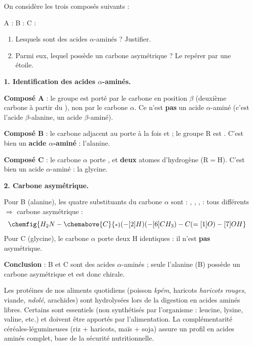 \documentclass[11pt]{article}
\newcommand{\cle}[1]{{\popxbold\color{popdark}#1}}
\begin{document}
\begin{exoresolu}
On considère les trois composés suivants :
\begin{center}
A :  \qquad
B :  \qquad
C : 
\end{center}
\begin{enumerate}
\item Lesquels sont des acides $\alpha$-aminés ? Justifier.
\item Parmi eux, lequel possède un carbone asymétrique ? Le repérer par une étoile.
\end{enumerate}
\tcblower
\textbf{1. Identification des acides $\alpha$-aminés.}

\textbf{Composé A} : le groupe  est porté par le carbone en position $\beta$ (deuxième carbone à partir du ), non par le carbone $\alpha$. Ce n'est \textbf{pas} un acide $\alpha$-aminé (c'est l'acide $\beta$-alanine, un acide $\beta$-aminé).

\textbf{Composé B} : le carbone adjacent au  porte à la fois  et  ; le groupe R est . C'est bien un \textbf{acide $\alpha$-aminé} : l'\cle{alanine}.

\textbf{Composé C} : le carbone $\alpha$ porte ,  et \textbf{deux} atomes d'hydrogène ($\mathrm{R}=\mathrm{H}$). C'est bien un acide $\alpha$-aminé : la \cle{glycine}.

\textbf{2. Carbone asymétrique.}

Pour B (alanine), les quatre substituants du carbone $\alpha$ sont : , , ,  : tous différents $\Rightarrow$ carbone asymétrique :
\[ \chemfig{H_2N-\chemabove{C}{\scriptstyle *}(-[2]H)(-[6]CH_3)-C(=[1]O)-[7]OH} \]
Pour C (glycine), le carbone $\alpha$ porte deux H identiques : il n'est \textbf{pas} asymétrique.

\textbf{Conclusion} : B et C sont des acides $\alpha$-aminés ; seule l'alanine (B) possède un carbone asymétrique et est donc chirale.
\end{exoresolu}

\begin{savaistu}
Les protéines de nos aliments quotidiens (poisson \emph{kpém}, haricots \emph{haricots rouges}, viande, \emph{ndolé}, arachides) sont hydrolysées lors de la digestion en acides aminés libres. Certains sont \cle{essentiels} (non synthétisés par l'organisme : leucine, lysine, valine, etc.) et doivent être apportés par l'alimentation. La complémentarité céréales-légumineuses (riz + haricots, maïs + soja) assure un profil en acides aminés complet, base de la sécurité nutritionnelle.
\end{savaistu}
\end{document}
